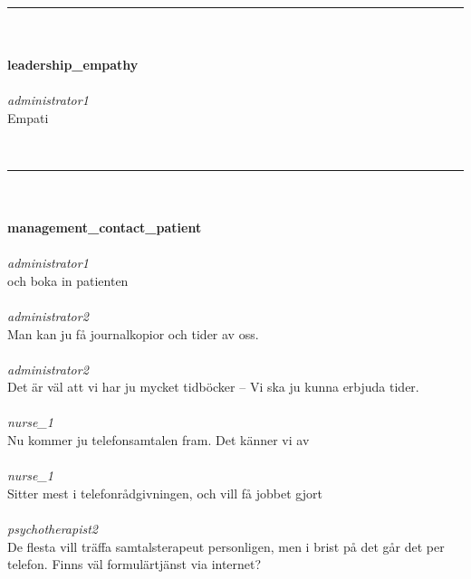 \documentclass[12pt,a4paper,oneside]{article}
\begin{document}
\ \vspace{.66em}\\
\hrule
\ \vspace{.33em}\\
\ \\{\bf leadership\_empathy }
\\\ \\%
 { \it administrator1 %
}\\
Empati %


\ \vspace{.66em}\\
\hrule
\ \vspace{.33em}\\
\ \\{\bf management\_contact\_patient }
\\\ \\%
 { \it administrator1 %
}\\
och boka in patienten %
\ \\\ \\
 { \it   administrator2 %
}\\
Man kan ju f{\aa} journalkopior och tider av oss. %
\ \\\ \\
 { \it   administrator2 %
}\\
Det {\"a}r v{\"a}l att vi har ju mycket tidb{\"o}cker -- Vi ska ju kunna erbjuda tider.  %
\ \\\ \\
 { \it   nurse\_1 %
}\\
Nu kommer ju telefonsamtalen fram. Det k{\"a}nner vi av %
\ \\\ \\
 { \it   nurse\_1 %
}\\
Sitter mest i telefonr{\aa}dgivningen, och vill f{\aa} jobbet gjort %
\ \\\ \\
 { \it   psychotherapist2 %
}\\
De flesta vill tr{\"a}ffa samtalsterapeut personligen, men i brist p{\aa} det g{\aa}r det per telefon. Finns v{\"a}l formul{\"a}rtj{\"a}nst via internet?  %
\end{document}
